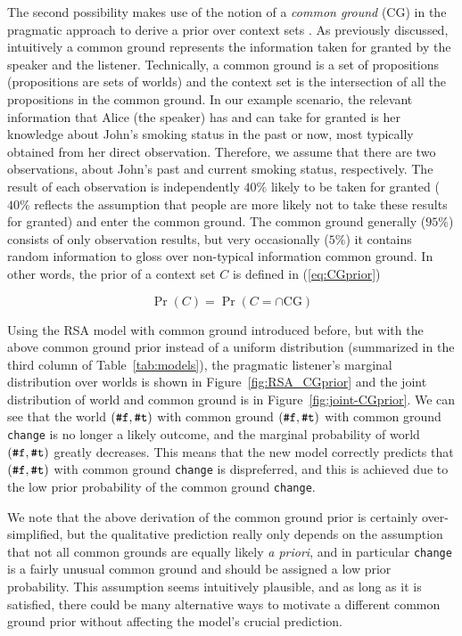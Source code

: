 
The second possibility makes use of the notion of a \emph{common ground} (CG) 
 in the pragmatic approach to derive a prior over context sets
 \cite{Stalnaker1974:Pragmatic-Presuppositions}.
As previously discussed, intuitively a common ground represents the information 
 taken for granted by the speaker and the listener.
Technically, a common ground is a set of propositions (propositions are sets of
  worlds) and the context set is the intersection of all the propositions in the common ground.
In our example scenario, the relevant information that Alice (the speaker) has 
 and can take for granted is her knowledge about John's smoking status in the 
 past or now, most typically obtained from her direct observation.
Therefore, we assume that there are two observations, about John's past and current
 smoking status, respectively. 
The result of each observation is independently $40\%$ likely to be taken for
 granted ($40\%$ reflects the assumption that people are more likely not to take these results for granted) and enter the common ground.
The common ground generally ($95\%$) consists of only observation results,
 but very occasionally ($5\%$) it contains random information to gloss over
 non-typical information common ground.
In other words, the prior of a context set $C$ is defined in (\ref{eq:CGprior})

\begin{equation}
\Pr(C) = \Pr(C=\cap\text{CG}) \label{eq:CGprior}
\end{equation}



Using the RSA model with common ground introduced before, 
 but with the above common ground prior instead of a uniform distribution 
 (summarized in the third column of Table~\ref{tab:models}), the pragmatic
 listener's marginal distribution over worlds is shown in Figure~\ref{fig:RSA_CGprior} and the joint distribution of world and
  common ground is in Figure~\ref{fig:joint-CGprior}. 
We can see that the world $(\verb+#f+, \verb+#t+)$ with common ground
 $(\verb+#f+, \verb+#t+)$ with common ground \verb=change= is no longer a likely outcome,
 and the marginal probability of world $(\verb+#f+, \verb+#t+)$ greatly decreases.
This means that the new model correctly predicts that $(\verb+#f+, \verb+#t+)$ with
 common ground \verb=change= is dispreferred, and this is achieved due to the low prior probability of the common ground \verb=change=.

We note that the above derivation of the common ground prior is certainly
 over-simplified, but the qualitative prediction really only depends on the 
 assumption that not all common grounds are equally likely \emph{a priori}, and 
 in particular \verb=change= is a fairly unusual common ground and 
 should be assigned a low prior probability.
This assumption seems intuitively plausible, and as long as it is satisfied, 
 there could be many alternative ways to motivate a different common ground prior
 without affecting the model's crucial prediction.
 
